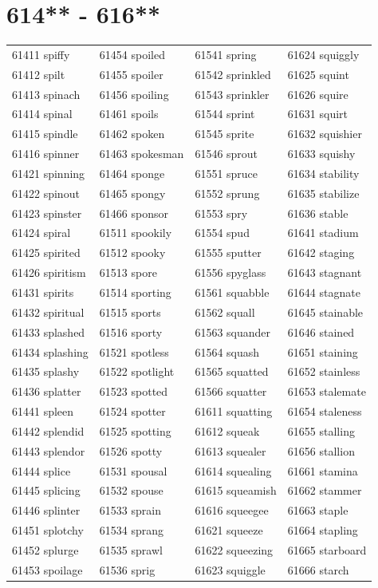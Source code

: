 \documentclass[10pt, oneside]{book}
\begin{document}
\begin{table}
	\centering
	\section*{614** - 616**}
	\begin{tabular}{l l l l}
61411 spiffy &61454 spoiled &61541 spring &61624 squiggly\\
61412 spilt &61455 spoiler &61542 sprinkled &61625 squint\\
61413 spinach &61456 spoiling &61543 sprinkler &61626 squire\\
61414 spinal &61461 spoils &61544 sprint &61631 squirt\\
61415 spindle &61462 spoken &61545 sprite &61632 squishier\\
61416 spinner &61463 spokesman &61546 sprout &61633 squishy\\
61421 spinning &61464 sponge &61551 spruce &61634 stability\\
61422 spinout &61465 spongy &61552 sprung &61635 stabilize\\
61423 spinster &61466 sponsor &61553 spry &61636 stable\\
61424 spiral &61511 spookily &61554 spud &61641 stadium\\
61425 spirited &61512 spooky &61555 sputter &61642 staging\\
61426 spiritism &61513 spore &61556 spyglass &61643 stagnant\\
61431 spirits &61514 sporting &61561 squabble &61644 stagnate\\
61432 spiritual &61515 sports &61562 squall &61645 stainable\\
61433 splashed &61516 sporty &61563 squander &61646 stained\\
61434 splashing &61521 spotless &61564 squash &61651 staining\\
61435 splashy &61522 spotlight &61565 squatted &61652 stainless\\
61436 splatter &61523 spotted &61566 squatter &61653 stalemate\\
61441 spleen &61524 spotter &61611 squatting &61654 staleness\\
61442 splendid &61525 spotting &61612 squeak &61655 stalling\\
61443 splendor &61526 spotty &61613 squealer &61656 stallion\\
61444 splice &61531 spousal &61614 squealing &61661 stamina\\
61445 splicing &61532 spouse &61615 squeamish &61662 stammer\\
61446 splinter &61533 sprain &61616 squeegee &61663 staple\\
61451 splotchy &61534 sprang &61621 squeeze &61664 stapling\\
61452 splurge &61535 sprawl &61622 squeezing &61665 starboard\\
61453 spoilage &61536 sprig &61623 squiggle &61666 starch\\
	\end{tabular}
 \end{table}
\clearpage
\end{document}
